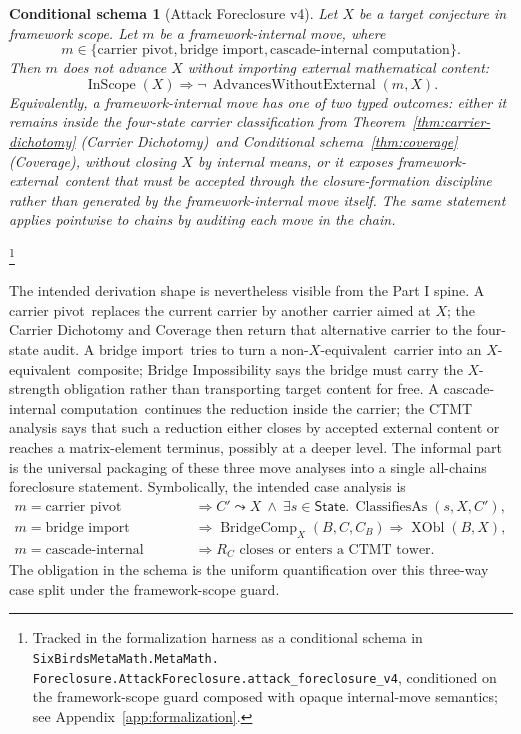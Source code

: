 \documentclass[11pt]{article}
\newcommand{\Xequiv}{$X$-equivalent}
\newcommand{\nonXequiv}{non-$X$-equivalent}
\newcommand{\thmCarrierDichotomy}{Theorem~\ref{thm:carrier-dichotomy} (Carrier Dichotomy)}
\newcommand{\thmCoverage}{Conditional schema~\ref{thm:coverage} (Coverage)}
\newcommand{\fim}{framework-internal move}
\newcommand{\carrierPivot}{carrier pivot}
\newcommand{\bridgeImport}{bridge import}
\newcommand{\cascadeInternal}{cascade-internal computation}
\newcommand{\FwExternal}{framework-external}
\newtheorem{schema}[theorem]{Conditional schema}
\theoremstyle{definition}
\begin{document}
\begin{schema}[Attack Foreclosure v4]\label{thm:attack-foreclosure-v4}
Let \(X\) be a target conjecture in framework scope.  Let \(m\) be a
\fim, where
\[
  m\in\{\mbox{\carrierPivot},\mbox{\bridgeImport},
  \mbox{\cascadeInternal}\}.
\]
Then \(m\) does not advance \(X\) without importing external
mathematical content:
\[
  \operatorname{InScope}(X)
  \Longrightarrow
  \neg\,\operatorname{AdvancesWithoutExternal}(m,X).
\]
Equivalently, a framework-internal move has one of two typed outcomes:
either it remains inside the four-state carrier classification from
\thmCarrierDichotomy\ and \thmCoverage, without closing \(X\) by
internal means, or it exposes \FwExternal\ content that must be
accepted through the closure-formation discipline rather than generated
by the framework-internal move itself.  The same statement applies
pointwise to chains by auditing each move in the chain.
\end{schema}
\footnote{\raggedright Tracked in the formalization harness as a
conditional schema in \texttt{SixBirdsMetaMath.MetaMath.\allowbreak
Foreclosure.AttackForeclosure.\allowbreak attack\_foreclosure\_v4},
conditioned on the framework-scope guard composed with opaque
internal-move semantics; see Appendix~\ref{app:formalization}.}

The intended derivation shape is nevertheless visible from the Part I
spine.  A \carrierPivot\ replaces the current carrier by another
carrier aimed at \(X\); the Carrier Dichotomy and Coverage then return
that alternative carrier to the four-state audit.  A \bridgeImport\
tries to turn a \nonXequiv\ carrier into an \Xequiv\ composite; Bridge
Impossibility says the bridge must carry the \(X\)-strength obligation
rather than transporting target content for free.  A
\cascadeInternal\ continues the reduction inside the carrier; the CTMT
analysis says that such a reduction either closes by accepted external
content or reaches a matrix-element terminus, possibly at a deeper
level.  The informal part is the universal packaging of these three
move analyses into a single all-chains foreclosure statement.
Symbolically, the intended case analysis is
\[
\begin{aligned}
  m=\mbox{\carrierPivot}
    &\Longrightarrow
    C'\leadsto X\ \wedge\
    \exists s\in\mathsf{State}.\,
      \operatorname{ClassifiesAs}(s,X,C'),\\
  m=\mbox{\bridgeImport}
    &\Longrightarrow
    \operatorname{BridgeComp}_X(B,C,C_B)
    \Rightarrow \operatorname{XObl}(B,X),\\
  m=\mbox{\cascadeInternal}
    &\Longrightarrow
    R_C \text{ closes or enters a CTMT tower.}
\end{aligned}
\]
The obligation in the schema is the uniform quantification over this
three-way case split under the framework-scope guard.
\end{document}
